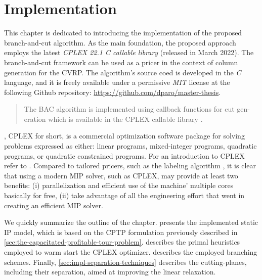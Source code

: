 \chapter{Implementation}
\label{sec:implementation-chapter}

This chapter is dedicated to introducing the implementation
of the proposed branch-and-cut algorithm.
As the main foundation, the proposed approach employs
the latest \textit{CPLEX 22.1 C callable library} (released in March 2022).
The branch-and-cut framework can be used as a pricer in the context
of column generation for the CVRP.
The algorithm's source coed is developed in the \textit{C} language,
and it is freely available under a permissive \textit{MIT} license
at the following Github repository: \url{https://github.com/dparo/master-thesis}.

\begin{quote}
	The BAC algorithm is implemented using callback functions for cut gen-
	eration which is available in the CPLEX callable library \cite{jepsen2008branchandcut}.
\end{quote}

\medskip

,
CPLEX for short,
is a commercial optimization software package for solving problems expressed as either:
linear programs, mixed-integer programs, quadratic programs, or quadratic constrained programs.
For an introduction to CPLEX refer to .
Compared to tailored pricers, such as the labeling algorithm \parencite{desrochers1992, feillet2004},
it is clear that using a modern MIP solver, such as CPLEX,
may provide at least two benefits:
(i) parallelization and efficient use of the machine' multiple cores basically for free,
(ii) take advantage of all the engineering effort that went in creating an efficient MIP solver.

\medskip

We quickly summarize the outline of the chapter.
 presents the implemented static IP model,
which is based on the CPTP formulation previously described in \cref{sec:the-capacitated-profitable-tour-problem}.
 describes the primal heuristics employed
to warm start the CPLEX optimizer.
 describes the employed branching schemes.
Finally, \cref{sec:impl-separation-techniques} describes the cutting-planes,
including their separation,
aimed at improving the linear relaxation.

